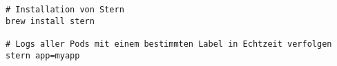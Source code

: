 \begin{verbatim}
# Installation von Stern
brew install stern

# Logs aller Pods mit einem bestimmten Label in Echtzeit verfolgen
stern app=myapp
\end{verbatim}